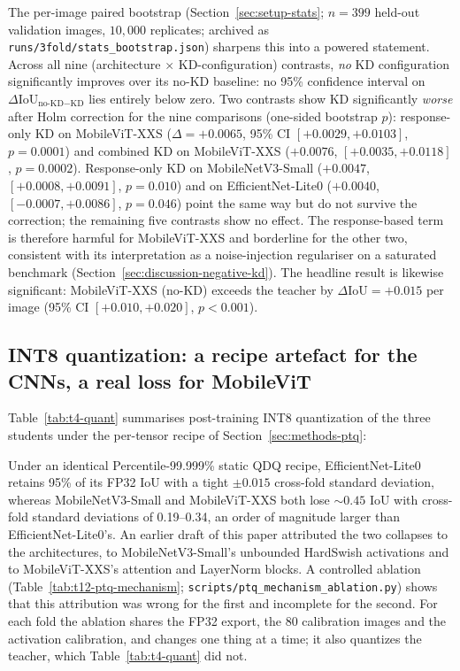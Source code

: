 The per-image paired bootstrap (Section~\ref{sec:setup-stats}; $n=399$ held-out validation images, $10{,}000$ replicates; archived as \texttt{runs/3fold/stats\_bootstrap.json}) sharpens this into a powered statement. Across all nine (architecture $\times$ KD-configuration) contrasts, \emph{no} KD configuration significantly improves over its no-KD baseline: no 95\% confidence interval on $\Delta\mathrm{IoU}_{\text{no-KD}-\text{KD}}$ lies entirely below zero. Two contrasts show KD significantly \emph{worse} after Holm correction for the nine comparisons (one-sided bootstrap $p$): response-only KD on MobileViT-XXS ($\Delta = +0.0065$, 95\% CI $[+0.0029,+0.0103]$, $p=0.0001$) and combined KD on MobileViT-XXS ($+0.0076$, $[+0.0035,+0.0118]$, $p=0.0002$). Response-only KD on MobileNetV3-Small ($+0.0047$, $[+0.0008,+0.0091]$, $p=0.010$) and on EfficientNet-Lite0 ($+0.0040$, $[-0.0007,+0.0086]$, $p=0.046$) point the same way but do not survive the correction; the remaining five contrasts show no effect. The response-based term is therefore harmful for MobileViT-XXS and borderline for the other two, consistent with its interpretation as a noise-injection regulariser on a saturated benchmark (Section~\ref{sec:discussion-negative-kd}). The headline result is likewise significant: MobileViT-XXS (no-KD) exceeds the teacher by $\Delta\mathrm{IoU} = +0.015$ per image (95\% CI $[+0.010,+0.020]$, $p < 0.001$).

\subsection{INT8 quantization: a recipe artefact for the CNNs, a real loss for MobileViT}
\label{sec:results-quant}

Table~\ref{tab:t4-quant} summarises post-training INT8 quantization of the three students under the per-tensor recipe of Section~\ref{sec:methods-ptq}:



Under an identical Percentile-99.999\% static QDQ recipe, EfficientNet-Lite0 retains 95\% of its FP32 IoU with a tight $\pm 0.015$ cross-fold standard deviation, whereas MobileNetV3-Small and MobileViT-XXS both lose $\sim 0.45$ IoU with cross-fold standard deviations of 0.19--0.34, an order of magnitude larger than EfficientNet-Lite0's. An earlier draft of this paper attributed the two collapses to the architectures, to MobileNetV3-Small's unbounded HardSwish activations and to MobileViT-XXS's attention and LayerNorm blocks. A controlled ablation (Table~\ref{tab:t12-ptq-mechanism}; \texttt{scripts/ptq\_mechanism\_ablation.py}) shows that this attribution was wrong for the first and incomplete for the second. For each fold the ablation shares the FP32 export, the 80 calibration images and the activation calibration, and changes one thing at a time; it also quantizes the teacher, which Table~\ref{tab:t4-quant} did not.

